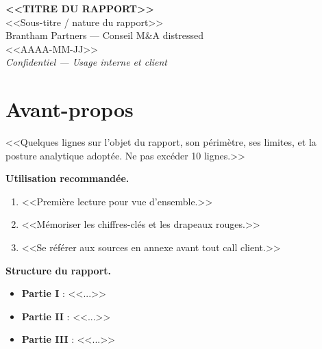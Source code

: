 \documentclass[11pt,a4paper]{article}
\newcommand{\rapportTitre}{<<TITRE DU RAPPORT>>}
\newcommand{\rapportSousTitre}{<<Sous-titre / nature du rapport>>}
\newcommand{\rapportContexte}{Brantham Partners --- Conseil M\&A distressed}
\newcommand{\rapportDate}{<<AAAA-MM-JJ>>}
\newcommand{\rapportConfidentiel}{Confidentiel --- Usage interne et client}
\begin{document}
\thispagestyle{empty}
\vspace*{\fill}
\begin{center}
{\Large\bfseries \rapportTitre}\\[1em]
{\normalsize \rapportSousTitre}\\[3em]
{\small \rapportContexte}\\[1em]
{\small \rapportDate}\\[1em]
{\footnotesize \itshape \rapportConfidentiel}
\end{center}
\vspace*{\fill}
\newpage

\tableofcontents
\newpage

\section*{Avant-propos}

<<Quelques lignes sur l'objet du rapport, son périmètre, ses limites, et la
posture analytique adoptée. Ne pas excéder 10 lignes.>>

\textbf{Utilisation recommandée.}
\begin{enumerate}[leftmargin=2em]
  \item <<Première lecture pour vue d'ensemble.>>
  \item <<Mémoriser les chiffres-clés et les drapeaux rouges.>>
  \item <<Se référer aux sources en annexe avant tout call client.>>
\end{enumerate}

\textbf{Structure du rapport.}
\begin{itemize}[leftmargin=2em]
  \item \textbf{Partie I} : <<...>>
  \item \textbf{Partie II} : <<...>>
  \item \textbf{Partie III} : <<...>>
\end{itemize}
\end{document}
